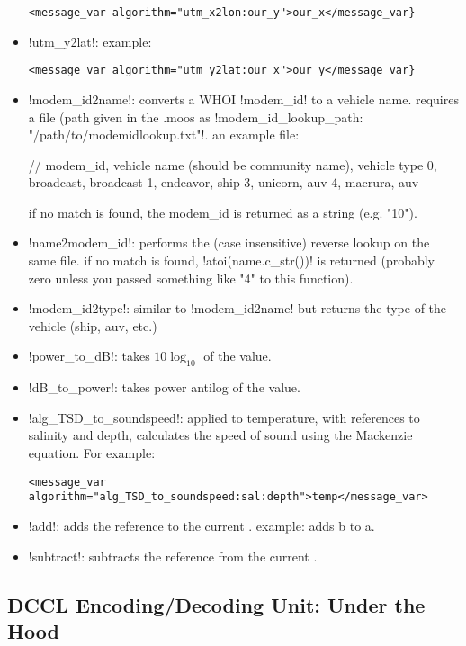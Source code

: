 \begin{itemize}
\begin{verbatim}<message_var algorithm="utm_x2lon:our_y">our_x</message_var}\end{verbatim}
\item !utm_y2lat!: example: 
\begin{verbatim}
<message_var algorithm="utm_y2lat:our_x">our_y</message_var}
\end{verbatim}
\item !modem_id2name!: converts a WHOI !modem_id! to a vehicle name. requires a file (path given in the .moos as !modem_id_lookup_path: "/path/to/modemidlookup.txt"!. an example file:
\begin{boxedverbatim}
// modem_id, vehicle name (should be community name), vehicle type
0, broadcast, broadcast
1, endeavor, ship
3, unicorn, auv
4, macrura, auv
\end{boxedverbatim}
\resetbvlinenumber
if no match is found, the modem\_id is returned as a string (e.g. "10").
\item !name2modem_id!: performs the (case insensitive) reverse lookup on the same file. if no match is found, !atoi(name.c_str())! is returned (probably zero unless you passed something like "4" to this function).
\item !modem_id2type!: similar to !modem_id2name! but returns the type of the vehicle (ship, auv, etc.)
\item !power_to_dB!: takes $10\log_{10}$ of the value.
\item !dB_to_power!: takes power antilog of the value.
\item !alg_TSD_to_soundspeed!: applied to temperature, with references to salinity and depth, calculates the speed of sound using the Mackenzie equation. For example:
\begin{verbatim}<message_var algorithm="alg_TSD_to_soundspeed:sal:depth">temp</message_var>\end{verbatim}
\item !add!: adds the reference  to the current . example:  adds b to a.
\item !subtract!: subtracts the reference  from the current .
\end{itemize}

\subsection{DCCL Encoding/Decoding Unit: Under the Hood}

